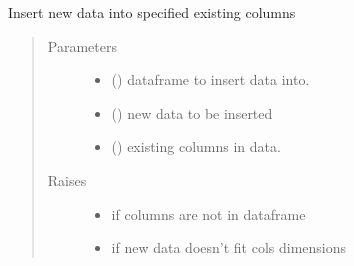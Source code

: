 \documentclass[letterpaper,10pt,english]{sphinxmanual}
\begin{document}
\begin{fulllineitems}
\label{\detokenize{dalio.util:dalio.util.insert_cols}}
Insert new data into specified existing columns
\begin{quote}\begin{description}
\item[{Parameters}] \leavevmode\begin{itemize}
\item {} 
 () \textendash{} dataframe to insert data into.

\item {} 
 () \textendash{} new data to be inserted

\item {} 
 (\sphinxstyleliteralemphasis{\sphinxupquote{, }}\sphinxstyleliteralemphasis{\sphinxupquote{, }}) \textendash{} existing columns in data.

\end{itemize}

\item[{Raises}] \leavevmode\begin{itemize}
\item {} 
 \textendash{} if columns are not in dataframe

\item {} 
 \textendash{} if new data doesn’t fit cols dimensions

\end{itemize}

\end{description}\end{quote}

\end{fulllineitems}

\end{document}
